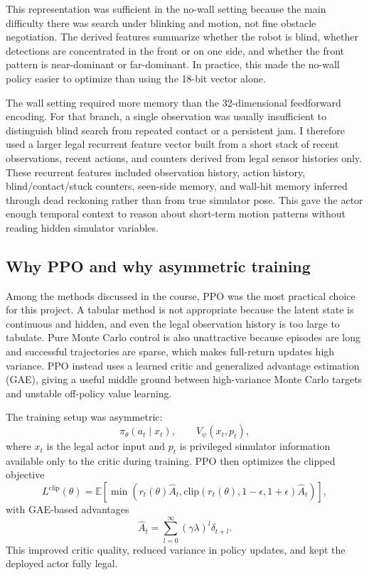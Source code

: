 \documentclass[11pt, oneside]{article}   	%
\begin{document}
This representation was sufficient in the no-wall setting because the main difficulty there was search under blinking and motion, not fine obstacle negotiation. The derived features summarize whether the robot is blind, whether detections are concentrated in the front or on one side, and whether the front pattern is near-dominant or far-dominant. In practice, this made the no-wall policy easier to optimize than using the 18-bit vector alone.

The wall setting required more memory than the 32-dimensional feedforward encoding. For that branch, a single observation was usually insufficient to distinguish blind search from repeated contact or a persistent jam. I therefore used a larger legal recurrent feature vector built from a short stack of recent observations, recent actions, and counters derived from legal sensor histories only. These recurrent features included observation history, action history, blind/contact/stuck counters, seen-side memory, and wall-hit memory inferred through dead reckoning rather than from true simulator pose. This gave the actor enough temporal context to reason about short-term motion patterns without reading hidden simulator variables.

\subsection{Why PPO and why asymmetric training}

Among the methods discussed in the course, PPO was the most practical choice for this project. A tabular method is not appropriate because the latent state is continuous and hidden, and even the legal observation history is too large to tabulate. Pure Monte Carlo control is also unattractive because episodes are long and successful trajectories are sparse, which makes full-return updates high variance. PPO instead uses a learned critic and generalized advantage estimation (GAE), giving a useful middle ground between high-variance Monte Carlo targets and unstable off-policy value learning.

The training setup was asymmetric:
\[
\pi_\theta(a_t\mid x_t), \qquad V_\psi(x_t,p_t),
\]
where \(x_t\) is the legal actor input and \(p_t\) is privileged simulator information available only to the critic during training. PPO then optimizes the clipped objective
\[
L^{\mathrm{clip}}(\theta)=
\mathbb{E}\!\left[
\min\!\left(
r_t(\theta)\hat A_t,
\mathrm{clip}(r_t(\theta),1-\epsilon,1+\epsilon)\hat A_t
\right)\right],
\]
with GAE-based advantages
\[
\hat A_t=\sum_{l=0}^{\infty}(\gamma\lambda)^l\delta_{t+l}.
\]
This improved critic quality, reduced variance in policy updates, and kept the deployed actor fully legal.
\end{document}
